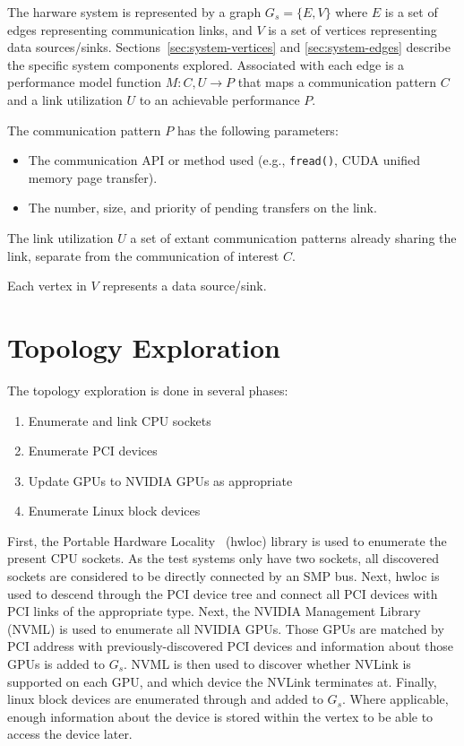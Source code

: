 The harware system is represented by a graph $G_s = \{E,V\}$ where $E$ is a set of edges representing communication links, and $V$ is a set of vertices representing data sources/sinks.
Sections~\ref{sec:system-vertices} and \ref{sec:system-edges} describe the specific system components explored.
Associated with each edge is a performance model function $M: C,U \rightarrow P$ that maps a communication pattern $C$ and a link utilization $U$ to an achievable performance $P$.

The communication pattern $P$ has the following parameters:
\begin{itemize}
    \item The communication API or method used (e.g., \texttt{fread()}, CUDA unified memory page transfer).
    \item The number, size, and priority of pending transfers on the link.
\end{itemize}

The link utilization $U$ a set of extant communication patterns already sharing the link, separate from the communication of interest $C$.



Each vertex in $V$ represents a data source/sink.



%
%
\section{Topology Exploration}
\label{sec:topology-exploration}

The topology exploration is done in several phases:

\begin{minipage}[h]{\textwidth}
\begin{enumerate}
    \item Enumerate and link CPU sockets
    \item Enumerate PCI devices
    \item Update GPUs to NVIDIA GPUs as appropriate
    \item Enumerate Linux block devices
\end{enumerate}
\end{minipage}

First, the Portable Hardware Locality~\cite{broquedis2010hwloc} (hwloc) library is used to enumerate the present CPU sockets.
As the test systems only have two sockets, all discovered sockets are considered to be directly connected by an SMP bus.
Next, hwloc is used to descend through the PCI device tree and connect all PCI devices with PCI links of the appropriate type.
Next, the NVIDIA Management Library~\cite{nvidia2017nvml} (NVML) is used to enumerate all NVIDIA GPUs.
Those GPUs are matched by PCI address with previously-discovered PCI devices and information about those GPUs is added to $G_s$.
NVML is then used to discover whether NVLink is supported on each GPU, and which device the NVLink terminates at.
Finally, linux block devices are enumerated through  and added to $G_s$.
Where applicable, enough information about the device is stored within the vertex to be able to access the device later.

